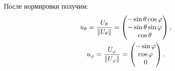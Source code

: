 После нормировки получим:
\begin{gather*}
    u_{\theta}
    = \frac{U_\theta}{\norm{U_\theta}}
    = \begin{pmatrix}
          - \sin \theta \cos \varphi \\
          - \sin \theta \sin \varphi \\
          \cos \theta
    \end{pmatrix}, \\
%
    u_{\varphi}
    = \frac{U_{\varphi}}{\norm{U_{\varphi}}}
    = \begin{pmatrix}
          - \sin \varphi \\
          \cos \varphi   \\
          0
    \end{pmatrix}.
\end{gather*}

